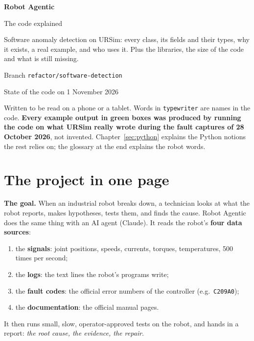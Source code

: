 \documentclass[10pt]{article}
\newcommand{\brkus}{\textunderscore\allowbreak}
\newcommand{\f}[1]{\texttt{\let\_\brkus #1}}
\begin{document}
\begin{titlepage}
\vspace*{18mm}
{\Huge\bfseries\color{accent} Robot Agentic}\par
\vspace{4pt}
{\LARGE The code explained}\par
\vspace{10pt}
{\large Software anomaly detection on URSim: every class, its fields and their types, why it exists, a real example, and who uses it. Plus the libraries, the size of the code and what is still missing.}\par
\vfill
Branch \f{refactor/software-detection}\par
State of the code on 1 November 2026\par
\vspace{6pt}
{\small\color{ink2} Written to be read on a phone or a tablet. Words in \f{typewriter} are names in the code. \textbf{Every example output in green boxes was produced by running the code on what URSim really wrote during the fault captures of 28 October 2026}, not invented. Chapter~\ref{sec:python} explains the Python notions the rest relies on; the glossary at the end explains the robot words.}
\vspace*{10mm}
\end{titlepage}

\tableofcontents
\newpage

\section{The project in one page}

\textbf{The goal.} When an industrial robot breaks down, a technician looks at what the robot
reports, makes hypotheses, tests them, and finds the cause. Robot Agentic does the same thing
with an AI agent (Claude). It reads the robot's \textbf{four data sources}:
\begin{enumerate}
\item the \textbf{signals}: joint positions, speeds, currents, torques, temperatures, 500 times per second;
\item the \textbf{logs}: the text lines the robot's programs write;
\item the \textbf{fault codes}: the official error numbers of the controller (e.g.\ \f{C209A0});
\item the \textbf{documentation}: the official manual pages.
\end{enumerate}
It then runs small, slow, operator-approved tests on the robot, and hands in a report:
\emph{the root cause, the evidence, the repair}.
\end{document}

